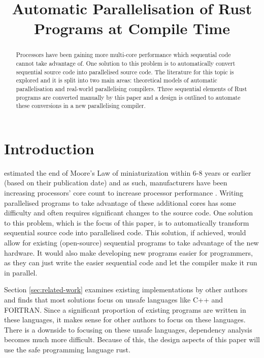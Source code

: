 \documentclass[conference]{IEEEtran}
\begin{document}
\title{Automatic Parallelisation of Rust Programs at Compile Time}

\author{
\and
{}
}

\maketitle

\begin{abstract}
  Processors have been gaining more multi-core performance which sequential code cannot take advantage of. One solution to this problem is to automatically convert sequential source code into parallelised source code. The literature for this topic is explored and it is split into two main areas: theoretical models of automatic parallelisation and real-world parallelising compilers. Three sequential elements of Rust programs are converted manually by this paper and a design is outlined to automate these conversions in a new parallelising compiler.
\end{abstract}

\section{Introduction}
\textcite{Kish2002} estimated the end of Moore's Law of miniaturization within 6-8 years or earlier (based on their publication date) and as such, manufacturers have been increasing processors' core count to increase processor performance \parencite{Geer2005}. Writing parallelised programs to take advantage of these additional cores has some difficulty and often requires significant changes to the source code. One solution to this problem, which is the focus of this paper, is to automatically transform sequential source code into parallelised code. This solution, if achieved, would allow for existing (open-source) sequential programs to take advantage of the new hardware. It would also make developing new programs easier for programmers, as they can just write the easier sequential code and let the compiler make it run in parallel.

Section \ref{sec:related-work} examines existing implementations by other authors and finds that most solutions focus on unsafe languages like C++ and FORTRAN. Since a significant proportion of existing programs are written in these languages, it makes sense for other authors to focus on these languages.  There is a downside to focusing on these unsafe languages, dependency analysis becomes much more difficult. Because of this, the design aspects of this paper will use the safe programming language rust.
\end{document}
